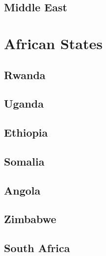 \subsection*{Middle East}

\section{African States}

\subsection*{Rwanda}

\subsection*{Uganda}

\subsection*{Ethiopia}

\subsection*{Somalia}

\subsection*{Angola}

\subsection*{Zimbabwe}

\subsection*{South Africa}
